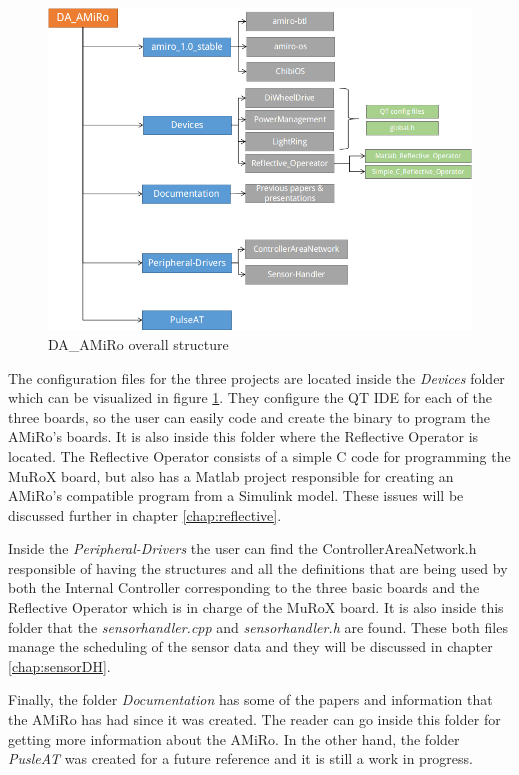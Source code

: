 \documentclass[12pt]{report}%
\begin{document}
\begin{figure}[ht]
	\centering
	\includegraphics[width=\textwidth]{DAAMIRO}
    \caption{DA\_AMiRo overall structure}
    \label{fig:DAAMIROstr}
\end{figure}

The configuration files for the three projects are located inside the \textit{Devices} folder which can be visualized in figure \ref{fig:DAAMIROstr}. They configure the QT IDE for each of the three boards, so the user can easily code and create the binary to program the AMiRo's boards. It is also inside this folder where the Reflective Operator is located. The Reflective Operator consists of a simple C code for programming the MuRoX board, but also has a Matlab project responsible for creating an AMiRo's compatible program from a Simulink model. These issues will be discussed further in chapter \ref{chap:reflective}.

Inside the \textit{Peripheral-Drivers} the user can find the ControllerAreaNetwork.h responsible of having the structures and all the definitions that are being used by both the Internal Controller corresponding to the three basic boards and the Reflective Operator which is in charge of the MuRoX board. It is also inside this folder that the \textit{sensorhandler.cpp} and \textit{sensorhandler.h} are found. These both files manage the scheduling of the sensor data and they will be discussed in chapter \ref{chap:sensorDH}.

Finally, the folder \textit{Documentation} has some of the papers and information that the AMiRo has had since it was created. The reader can go inside this folder for getting more information about the AMiRo. In the other hand, the folder \textit{PusleAT} was created for a future reference and it is still a work in progress.
\end{document}
